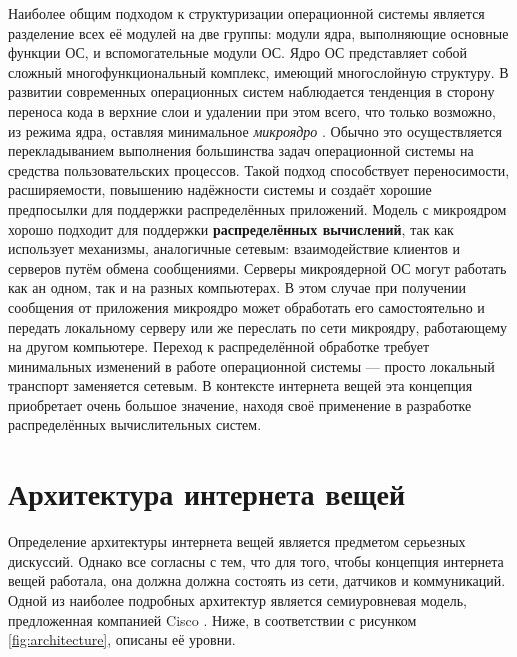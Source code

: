 Наиболее общим подходом к структуризации операционной системы является разделение всех её модулей на две группы: модули ядра, выполняющие основные функции ОС, и вспомогательные модули ОС. Ядро ОС \cite{Olifer} представляет собой сложный многофункциональный комплекс, имеющий многослойную структуру. В развитии современных операционных систем наблюдается тенденция в сторону переноса кода в верхние слои и удалении при этом всего, что только возможно, из режима ядра, оставляя минимальное \textit{микроядро} \cite{Tanenbaum}. Обычно это осуществляется перекладыванием выполнения большинства задач операционной системы на средства пользовательских процессов. Такой подход способствует переносимости, расширяемости, повышению надёжности системы и создаёт хорошие предпосылки для поддержки распределённых приложений. Модель с микроядром хорошо подходит для поддержки \textbf{распределённых вычислений}, так как использует механизмы, аналогичные сетевым: взаимодействие клиентов и серверов путём обмена сообщениями. Серверы микроядерной ОС могут работать как ан одном, так и на разных компьютерах. В этом случае при получении сообщения от приложения микроядро может обработать его самостоятельно и передать локальному серверу или же переслать по сети микроядру, работающему на другом компьютере. Переход к распределённой обработке требует минимальных изменений в работе операционной системы --- просто локальный транспорт заменяется сетевым. В контексте интернета вещей эта концепция приобретает очень большое значение, находя своё применение в разработке распределённых вычислительных систем. \cite{Olifer}



\section{Архитектура интернета вещей} 

Определение архитектуры интернета вещей является предметом серьезных дискуссий. Однако все согласны с тем, что для того, чтобы концепция интернета вещей работала, она должна должна состоять из сети, датчиков и коммуникаций. Одной из наиболее подробных архитектур является семиуровневая модель, предложенная компанией Cisco \cite{Cisco}. Ниже, в соответствии с рисунком \ref{fig:architecture}, описаны её уровни. \cite{Cisco_architecture_big} \cite{Cisco_architecture_small}

